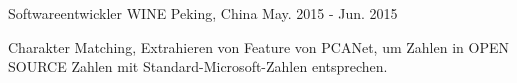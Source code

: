 \begin{cventries}

\cventry
{Softwareentwickler} %
{WINE} %
{Peking, China} %
{May. 2015 - Jun. 2015} %
{ %
\begin{cvitems}
\item {Charakter Matching, Extrahieren von Feature von PCANet, um Zahlen in OPEN SOURCE Zahlen mit Standard-Microsoft-Zahlen entsprechen.}
\end{cvitems}
}


\end{cventries}
